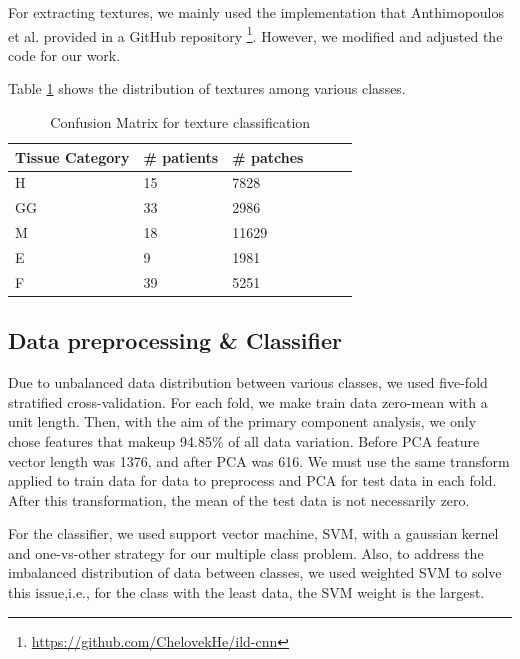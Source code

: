 \documentclass[conference]{IEEEtran}
\begin{document}
For extracting textures, we mainly used the implementation that Anthimopoulos et al. \cite{textureextract} provided in a GitHub repository \footnote{ \url{https://github.com/ChelovekHe/ild-cnn}}. However, we modified and adjusted the code for our work.

Table \ref{cm:datadist} shows the distribution of textures among various classes.



\begin{table}[tbh]
\caption{Confusion Matrix for texture classification}
\label{cm:datadist}
\small
\centering
\begin{tabular}{@{}llllll@{}}
\toprule
 Tissue Category& \# patients & \# patches & \\ \midrule
 
H& 15&7828 \\ 
GG&33&2986\\ 
M&18 &11629 \\ 
E&9 &1981 \\ 
F& 39&5251 \\ \bottomrule

\end{tabular}
\end{table}



\subsection{\textbf{Data preprocessing \& Classifier}}
Due to unbalanced data distribution between various classes, we used five-fold stratified cross-validation. For each fold, we make train data zero-mean with a unit length. Then, with the aim of the primary component analysis, we only chose features that makeup 94.85\% of all data variation. Before PCA feature vector length was 1376, and after PCA was 616. We must use the same transform applied to train data for data to preprocess and PCA for test data in each fold. After this transformation, the mean of the test data is not necessarily zero.

For the classifier, we used support vector machine, SVM, with a gaussian kernel and one-vs-other strategy for our multiple class problem. Also, to address the imbalanced distribution of data between classes, we used weighted SVM to solve this issue,i.e., for the class with the least data, the SVM weight is the largest.
\end{document}
